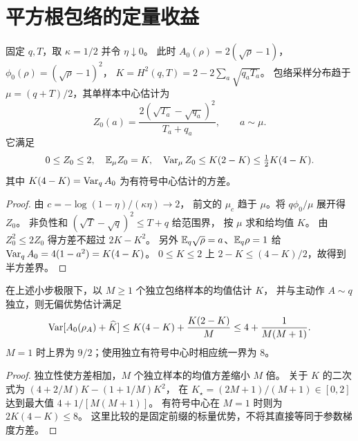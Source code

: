 \section{平方根包络的定量收益}
\begin{proposition}[小步平方根中心的半方差界]
\label{prop:root-envelope}
固定 $q,T$，取 $\kappa=1/2$ 并令 $\eta\downarrow0$。
此时 $A_0(\rho)=2(\sqrt\rho-1)$，
$\phi_0(\rho)=(\sqrt\rho-1)^2$，
$K=H^2(q,T)=2-2\sum_a\sqrt{q_aT_a}$。
包络采样分布趋于 $\mu=(q+T)/2$，其单样本中心估计为
\begin{equation}
Z_0(a)=\frac{2(\sqrt{T_a}-\sqrt{q_a})^2}{T_a+q_a},
\qquad a\sim\mu.
\end{equation}
它满足
\begin{equation}
0\le Z_0\le2,\quad \mathbb E_\mu Z_0=K,\quad
\operatorname{Var}_\mu Z_0\le K(2-K)\le\tfrac12 K(4-K).
\end{equation}
其中 $K(4-K)=\operatorname{Var}_q A_0$ 为有符号中心估计的方差。
\end{proposition}
\begin{proof}
由 $c=-\log(1-\eta)/(\kappa\eta)\to2$，
前文的 $\mu_c$ 趋于 $\mu$。将 $q\phi_0/\mu$ 展开得 $Z_0$。
非负性和 $(\sqrt T-\sqrt q)^2\le T+q$ 给范围界，
按 $\mu$ 求和给均值 $K$。
由 $Z_0^2\le2Z_0$ 得方差不超过 $2K-K^2$。
另外 $\mathbb E_q\sqrt\rho=a$、$\mathbb E_q\rho=1$ 给
$\operatorname{Var}_q A_0=4(1-a^2)=K(4-K)$。
$0\le K\le2$ 上 $2-K\le(4-K)/2$，故得到半方差界。
\end{proof}

\begin{corollary}[独立中心后的统一优势方差]
\label{cor:root-center-budget}
在上述小步极限下，以 $M\ge1$ 个独立包络样本的均值估计 $K$，
并与主动作 $A\sim q$ 独立，则无偏优势估计满足
\begin{equation}
\operatorname{Var}[A_0(\rho_A)+\widehat K]
\le K(4-K)+\frac{K(2-K)}M
\le4+\frac1{M(M+1)}.
\end{equation}
$M=1$ 时上界为 $9/2$；使用独立有符号中心时相应统一界为 $8$。
\end{corollary}
\begin{proof}
独立性使方差相加，$M$ 个独立样本的均值方差缩小 $M$ 倍。
关于 $K$ 的二次式为
$(4+2/M)K-(1+1/M)K^2$，
在 $K_\star=(2M+1)/(M+1)\in[0,2]$ 达到最大值
$4+1/[M(M+1)]$。
有符号中心在 $M=1$ 时则为 $2K(4-K)\le8$。
这里比较的是固定前缀的标量优势，不将其直接等同于参数梯度方差。
\end{proof}

